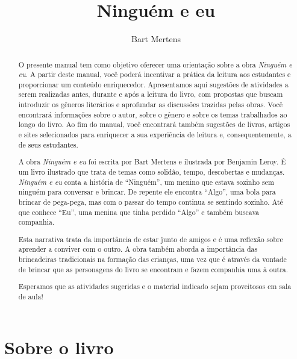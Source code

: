 \documentclass[11pt]{extarticle}
\newcommand{\AutorLivro}{Bart Mertens}
\newcommand{\TituloLivro}{Ninguém e eu}
\newcommand{\colaborador}{Ana Lancman}
\begin{document}
\title{\TituloLivro}
\author{\AutorLivro}
\def\authornotes{\colaborador}

\date{}
\maketitle


\tableofcontents
\pagebreak

\begin{abstract}
O presente manual tem como objetivo oferecer uma orientação sobre a obra \textit{Ninguém e eu}. A partir deste manual, você poderá incentivar a prática da leitura aos estudantes e proporcionar um conteúdo enriquecedor. Apresentamos aqui sugestões de atividades a serem realizadas antes, durante e após a leitura do livro, com propostas que buscam introduzir os gêneros literários e aprofundar as discussões trazidas pelas obras. Você encontrará informações sobre o autor, sobre o gênero e sobre os temas trabalhados ao longo do livro. Ao fim do manual, você encontrará também sugestões de livros, artigos e sites selecionados para enriquecer a sua experiência de leitura e, consequentemente, a de seus estudantes.

A obra \textit{Ninguém e eu} foi escrita por Bart Mertens e ilustrada por Benjamin Leroy. É um livro ilustrado que trata de temas como solidão, tempo, descobertas e mudanças. \textit{Ninguém e eu} conta a história de ``Ninguém'', um menino que estava sozinho sem ninguém para conversar e brincar. De repente ele encontra ``Algo'', uma bola para brincar de pega-pega, mas com o passar do tempo continua se sentindo sozinho. Até que conhece ``Eu'', uma menina que tinha perdido ``Algo'' e também buscava companhia.

Esta narrativa trata da importância de estar junto de amigos e é uma reflexão sobre aprender a conviver com o outro. 
A obra também aborda a importância das brincadeiras tradicionais na formação das crianças, uma vez que é através da vontade de brincar que as personagens do livro se encontram e fazem companhia uma à outra. 

Esperamos que as atividades sugeridas e o material indicado sejam proveitosos em sala de aula!

\end{abstract}

\section{Sobre o livro}
\end{document}
